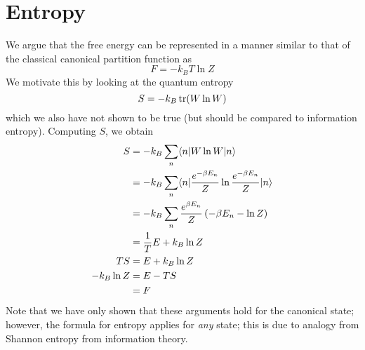 \section{Entropy}
We argue that the free energy can be represented in a manner similar to that of the classical canonical partition function as
\begin{equation}
	F = -k_BT\ln Z
\end{equation}
We motivate this by looking at the quantum entropy
\begin{equation}
	S = -k_B \operatorname{tr}(W\ln W)
\end{equation}
which we also have not shown to be true (but should be compared to information entropy).
Computing \(S\), we obtain
\begin{align*}
	S &= -k_B\sum_n\langle n\rvert W\ln W \lvert n\rangle\\
	  &=-k_B \sum_n \langle n\rvert \frac{e^{-\beta E_n}}{Z}\ln \frac{e^{-\beta E_n}}{Z} \lvert n\rangle\\
	&=-k_B\sum_n \frac{e^{\beta E_n}}{Z}\left(-\beta E_n - \ln Z\right)\\
	&=\frac{1}{T}E + k_B\ln Z\\
	TS &= E+k_B\ln Z\\
	-k_B\ln Z&= E-TS\\
		 &= F	
\end{align*}
Note that we have only shown that these arguments hold for the canonical state; however, the formula for entropy applies for \emph{any} state; this is due to analogy from Shannon entropy from information theory.


